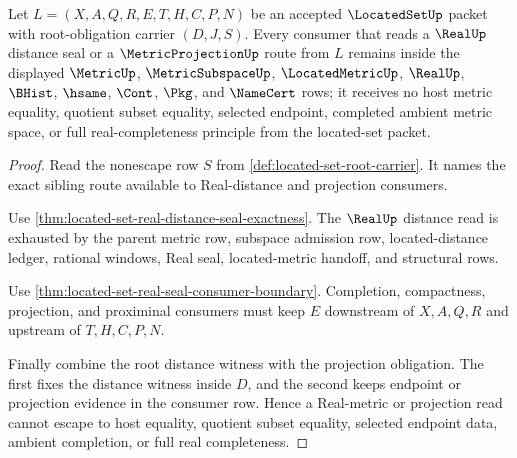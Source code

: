 \begin{theorem}
\label{thm:located-set-root-real-metric-nonescape}
Let $L=(X,A,Q,R,E,T,H,C,P,N)$ be an accepted $\LocatedSetUp$ packet with root-obligation carrier $(D,J,S)$. Every consumer that reads a $\RealUp$ distance seal or a $\MetricProjectionUp$ route from $L$ remains inside the displayed $\MetricUp$, $\MetricSubspaceUp$, $\LocatedMetricUp$, $\RealUp$, $\BHist$, $\hsame$, $\Cont$, $\Pkg$, and $\NameCert$ rows; it receives no host metric equality, quotient subset equality, selected endpoint, completed ambient metric space, or full real-completeness principle from the located-set packet.
\end{theorem}
\begin{proof}
Read the nonescape row $S$ from \autoref{def:located-set-root-carrier}. It names the exact sibling route available to Real-distance and projection consumers.

Use \autoref{thm:located-set-real-distance-seal-exactness}. The $\RealUp$ distance read is exhausted by the parent metric row, subspace admission row, located-distance ledger, rational windows, Real seal, located-metric handoff, and structural rows.

Use \autoref{thm:located-set-real-seal-consumer-boundary}. Completion, compactness, projection, and proximinal consumers must keep $E$ downstream of $X,A,Q,R$ and upstream of $T,H,C,P,N$.

Finally combine the root distance witness with the projection obligation. The first fixes the distance witness inside $D$, and the second keeps endpoint or projection evidence in the consumer row. Hence a Real-metric or projection read cannot escape to host equality, quotient subset equality, selected endpoint data, ambient completion, or full real completeness.
\end{proof}

